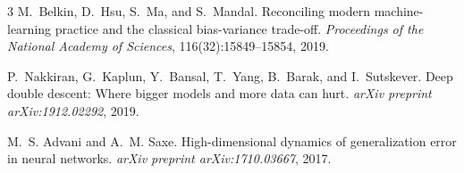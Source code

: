 \documentclass[11pt]{article}
\begin{document}

\begin{thebibliography}{3}
M.~Belkin, D.~Hsu, S.~Ma, and S.~Mandal.
\newblock Reconciling modern machine-learning practice and the classical bias-variance trade-off.
\newblock \emph{Proceedings of the National Academy of Sciences}, 116(32):15849--15854, 2019.

P.~Nakkiran, G.~Kaplun, Y.~Bansal, T.~Yang, B.~Barak, and I.~Sutskever.
\newblock Deep double descent: Where bigger models and more data can hurt.
\newblock \emph{arXiv preprint arXiv:1912.02292}, 2019.

M.~S. Advani and A.~M. Saxe.
\newblock High-dimensional dynamics of generalization error in neural networks.
\newblock \emph{arXiv preprint arXiv:1710.03667}, 2017.
\end{thebibliography}
\end{document}
